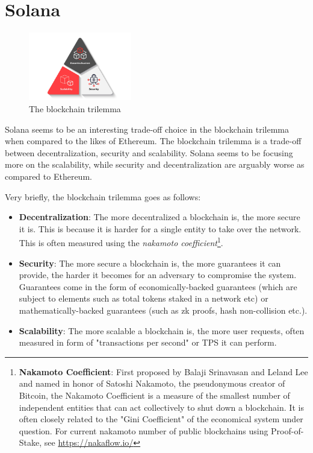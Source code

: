 
\chapter{Solana}

\begin{figure}
    \centering
    \includegraphics[width=0.40\textwidth]{solana/assets/blockchain-trilemma.png}
    \caption{The blockchain trilemma}
    \label{fig:blockchain-trilemma}
\end{figure}

Solana seems to be an interesting trade-off choice in the blockchain trilemma when compared to the likes of Ethereum. The blockchain trilemma is a trade-off between decentralization, security and scalability. Solana seems to be focusing more on the scalability, while security and decentralization are arguably worse as compared to Ethereum.

Very briefly, the blockchain trilemma goes as follows:
\begin{itemize}
    \item \textbf{Decentralization}: The more decentralized a blockchain is, the more secure it is. This is because it is harder for a single entity to take over the network. This is often measured using the \textit{nakamoto coefficient}\footnote{\textbf{Nakamoto Coefficient}: First proposed by Balaji Srinavasan and Leland Lee and named in honor of Satoshi Nakamoto, the pseudonymous creator of Bitcoin, the Nakamoto Coefficient is a measure of the smallest number of independent entities that can act collectively to shut down a blockchain. It is often closely related to the "Gini Coefficient" of the economical system under question. For current nakamoto number of public blockchains using Proof-of-Stake, see \href{https://nakaflow.io/}{https://nakaflow.io/}}.
    \item \textbf{Security}: The more secure a blockchain is, the more guarantees it can provide, the harder it becomes for an adversary to compromise the system. Guarantees come in the form of economically-backed guarantees (which are subject to elements such as total tokens staked in a network etc) or mathematically-backed guarantees (such as zk proofs, hash non-collision etc.).
    \item \textbf{Scalability}: The more scalable a blockchain is, the more user requests, often measured in form of "transactions per second" or TPS it can perform.
\end{itemize}

